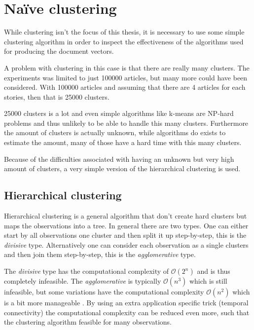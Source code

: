 \section{Naïve clustering}

While clustering isn't the focus of this thesis, it is necessary to use some simple clustering algorithm in order to inspect the effectiveness of the algorithms used for producing the document vectors.

A problem with clustering in this case is that there are really many clusters. The experiments was limited to just 100000 articles, but many more could have been considered. With 100000 articles and assuming that there are 4 articles for each stories, then that is 25000 clusters.

25000 clusters is a lot and even simple algorithms like k-means are NP-hard problems and thus unlikely to be able to handle this many clusters. Furthermore the amount of clusters is actually unknown, while algorithms do exists to estimate the amount, many of those have a hard time with this many clusters.

Because of the difficulties associated with having an unknown but very high amount of clusters, a very simple version of the hierarchical clustering is used.

\subsection{Hierarchical clustering}

Hierarchical clustering is a general algorithm that don't create hard clusters but maps the observations into a tree. In general there are two types. One can either start by all observations one cluster and then split it up step-by-step, this is the \textit{divisive} type. Alternatively one can consider each observation as a single clusters and then join them step-by-step, this is the \textit{agglomerative} type.

The \textit{divisive} type has the computational complexity of $\mathcal{O}(2^n)$ and is thus completely infeasible. The \textit{agglomerative} is typically $\mathcal{O}(n^3)$ which is still infeasible, but some variations have the computational complexity $\mathcal{O}(n^2)$ which is a bit more manageable \cite{wiki-hcluster}. By using an extra application specific trick (temporal connectivity) the computational complexity can be reduced even more, such that the clustering algorithm feasible for many observations.

